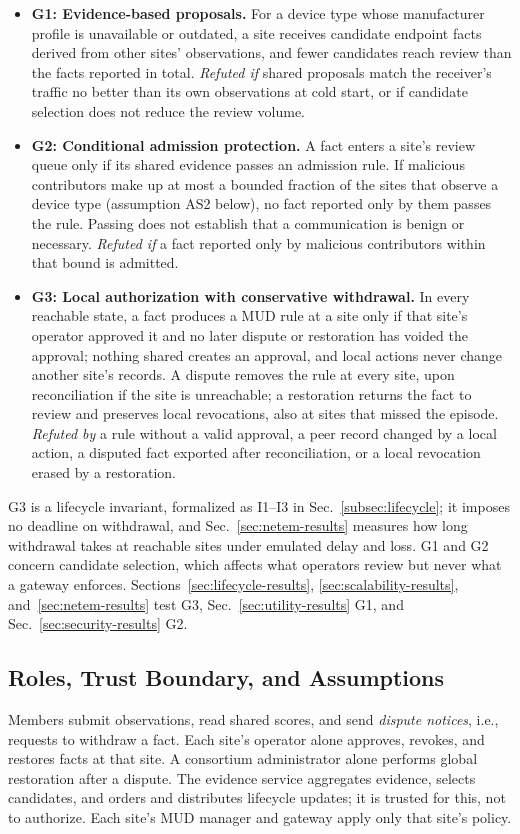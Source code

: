 \documentclass[journal]{IEEEtran}
\theoremstyle{definition}
\begin{document}
\begin{itemize}
\item \textbf{G1: Evidence-based proposals.} For a device type whose manufacturer profile is unavailable or outdated, a site receives candidate endpoint facts derived from other sites' observations, and fewer candidates reach review than the facts reported in total. \emph{Refuted if} shared proposals match the receiver's traffic no better than its own observations at cold start, or if candidate selection does not reduce the review volume.

\item \textbf{G2: Conditional admission protection.} A fact enters a site's review queue only if its shared evidence passes an admission rule. If malicious contributors make up at most a bounded fraction of the sites that observe a device type (assumption AS2 below), no fact reported only by them passes the rule. Passing does not establish that a communication is benign or necessary. \emph{Refuted if} a fact reported only by malicious contributors within that bound is admitted.

\item \textbf{G3: Local authorization with conservative withdrawal.} In every reachable state, a fact produces a MUD rule at a site only if that site's operator approved it and no later dispute or restoration has voided the approval; nothing shared creates an approval, and local actions never change another site's records. A dispute removes the rule at every site, upon reconciliation if the site is unreachable; a restoration returns the fact to review and preserves local revocations, also at sites that missed the episode. \emph{Refuted by} a rule without a valid approval, a peer record changed by a local action, a disputed fact exported after reconciliation, or a local revocation erased by a restoration.
\end{itemize}

G3 is a lifecycle invariant, formalized as I1--I3 in Sec.~\ref{subsec:lifecycle}; it imposes no deadline on withdrawal, and Sec.~\ref{sec:netem-results} measures how long withdrawal takes at reachable sites under emulated delay and loss. G1 and G2 concern candidate selection, which affects what operators review but never what a gateway enforces. Sections~\ref{sec:lifecycle-results}, \ref{sec:scalability-results}, and~\ref{sec:netem-results} test G3, Sec.~\ref{sec:utility-results} G1, and Sec.~\ref{sec:security-results} G2.

\subsection{Roles, Trust Boundary, and Assumptions}
\label{subsec:trust}
Members submit observations, read shared scores, and send \emph{dispute notices}, i.e., requests to withdraw a fact. Each site's operator alone approves, revokes, and restores facts at that site. A consortium administrator alone performs global restoration after a dispute. The evidence service aggregates evidence, selects candidates, and orders and distributes lifecycle updates; it is trusted for this, not to authorize. Each site's MUD manager and gateway apply only that site's policy.
\end{document}
